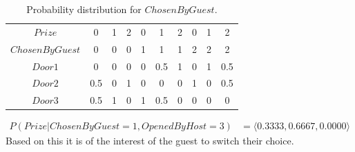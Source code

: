 \documentclass[10pt, a4paper, english]{../Template/NTNUoving}
\begin{document}
\begin{oppgave}
\begin{punkt}
        \begin{table}[H]
            \centering
            \begin{tabular}{|c|c|c|c|c|c|c|c|c|c|}
                \hline
                $Prize$ & 0 & 1 & 2 & 0 & 1 & 2 & 0 & 1 & 2 \\ [1.0ex]
                $ChosenByGuest$ & 0 & 0 & 0 & 1 & 1 & 1 & 2& 2 & 2 \\ [1.0ex]
                \hline
                $Door1$ & 0 & 0 & 0 & 0 & 0.5 & 1 & 0 & 1  & 0.5 \\ [1.0ex]
                $Door2$ & 0.5 & 0 & 1 & 0 & 0 & 0 & 1 & 0 & 0.5 \\ [1.0ex]
                $Door3$ & 0.5 & 1 & 0 & 1 & 0.5 & 0 & 0 & 0 & 0 \\ [1.0ex]
                \hline
            \end{tabular}
            \caption{Probability distribution for $ChosenByGuest$.}
        \end{table}

        \begin{align*}
            P(Prize | ChosenByGuest = 1, OpenedByHost = 3) &= \langle 0.3333, 0.6667, 0.0000 \rangle
        \end{align*}
        Based on this it is of the interest of the guest to switch their choice.
    \end{punkt}
\end{oppgave}
\end{document}
